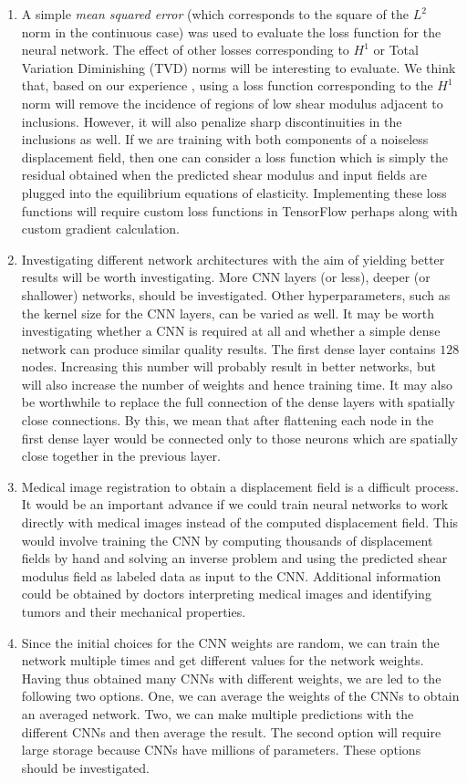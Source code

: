 \documentclass[12pt]{article}
\begin{document}
\begin{enumerate}
\item{A simple \textit{mean squared error} (which corresponds to the square of the $L^2$ norm in the continuous case) was used to evaluate the loss function for the neural network. The effect of other losses corresponding to $H^1$ or Total Variation Diminishing (TVD) norms will be interesting to evaluate. We think that, based on our experience \cite{diss:gokhale2007}, using a loss function corresponding to the $H^1$ norm will remove the incidence of regions of low shear modulus adjacent to inclusions. However, it will also penalize sharp discontinuities in the inclusions as well. If we are training with both components of a noiseless displacement field, then one can consider a loss function which is simply the residual obtained when the predicted shear modulus and input fields are plugged into the equilibrium equations of elasticity. Implementing these loss functions will require custom loss functions in TensorFlow perhaps along with custom gradient calculation.}
\item{Investigating different network architectures with the aim of yielding better results will be worth investigating. More CNN layers (or less), deeper (or shallower) networks, should be investigated. Other hyperparameters, such as the kernel size for the CNN layers, can be varied as well. It may be worth investigating whether a CNN is required at all and whether a simple dense network can produce similar quality results. The first dense layer contains $128$ nodes. Increasing this number will probably result in better networks, but will also increase the number of weights and hence training time. It may also be worthwhile to replace the full connection of the dense layers with spatially close connections. By this, we mean that after flattening each node in the first dense layer would be connected only to those neurons which are spatially close together in the previous layer.}
\item{Medical image registration to obtain a displacement field is a difficult process. It would be an important advance if we could train neural networks to work directly with medical images instead of the computed displacement field. This would involve training the CNN by computing thousands of displacement fields by hand and solving an inverse problem and using the predicted shear modulus field as labeled data as input to the CNN. Additional information could be obtained by doctors interpreting medical images and identifying tumors and their mechanical properties.}
\item{Since the initial choices for the CNN weights are random, we can train the network multiple times and get different values for the network weights. Having thus obtained many CNNs with different weights, we are led to the following two options. One, we can average the weights of the CNNs to obtain an averaged network. Two, we can make multiple predictions with the different CNNs and then average the result. The second option will require large storage because CNNs have millions of parameters. These options should be investigated.}

\end{enumerate}
\end{document}
